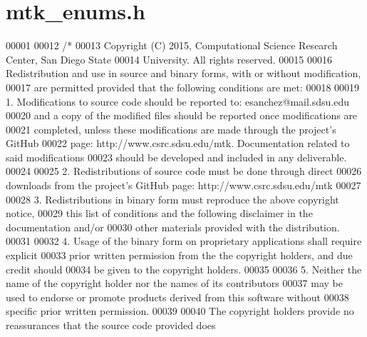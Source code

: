 \hypertarget{mtk__enums_8h_source}{\section{mtk\+\_\+enums.\+h}
\label{mtk__enums_8h_source}
}

\begin{DoxyCode}
00001 
00012 \textcolor{comment}{/*}
00013 \textcolor{comment}{Copyright (C) 2015, Computational Science Research Center, San Diego State}
00014 \textcolor{comment}{University. All rights reserved.}
00015 \textcolor{comment}{}
00016 \textcolor{comment}{Redistribution and use in source and binary forms, with or without modification,}
00017 \textcolor{comment}{are permitted provided that the following conditions are met:}
00018 \textcolor{comment}{}
00019 \textcolor{comment}{1. Modifications to source code should be reported to: esanchez@mail.sdsu.edu}
00020 \textcolor{comment}{and a copy of the modified files should be reported once modifications are}
00021 \textcolor{comment}{completed, unless these modifications are made through the project's GitHub}
00022 \textcolor{comment}{page: http://www.csrc.sdsu.edu/mtk. Documentation related to said modifications}
00023 \textcolor{comment}{should be developed and included in any deliverable.}
00024 \textcolor{comment}{}
00025 \textcolor{comment}{2. Redistributions of source code must be done through direct}
00026 \textcolor{comment}{downloads from the project's GitHub page: http://www.csrc.sdsu.edu/mtk}
00027 \textcolor{comment}{}
00028 \textcolor{comment}{3. Redistributions in binary form must reproduce the above copyright notice,}
00029 \textcolor{comment}{this list of conditions and the following disclaimer in the documentation and/or}
00030 \textcolor{comment}{other materials provided with the distribution.}
00031 \textcolor{comment}{}
00032 \textcolor{comment}{4. Usage of the binary form on proprietary applications shall require explicit}
00033 \textcolor{comment}{prior written permission from the the copyright holders, and due credit should}
00034 \textcolor{comment}{be given to the copyright holders.}
00035 \textcolor{comment}{}
00036 \textcolor{comment}{5. Neither the name of the copyright holder nor the names of its contributors}
00037 \textcolor{comment}{may be used to endorse or promote products derived from this software without}
00038 \textcolor{comment}{specific prior written permission.}
00039 \textcolor{comment}{}
00040 \textcolor{comment}{The copyright holders provide no reassurances that the source code provided does}

\end{DoxyCode}
